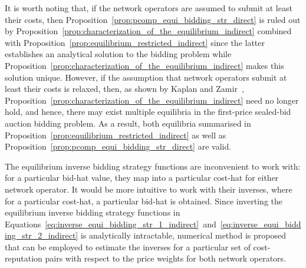 It is worth noting that, if the network operators are assumed to submit at least their costs, then Proposition~\ref{prop:pcomp_equi_bidding_str_direct} is ruled out by Proposition~\ref{prop:characterization_of_the_equilibrium_indirect} combined with Proposition~\ref{prop:equilibrium_restricted_indirect} since the latter establishes an analytical solution to the bidding problem while Proposition~\ref{prop:characterization_of_the_equilibrium_indirect} makes this solution unique. However, if the assumption that network operators submit at least their costs is relaxed, then, as shown by Kaplan and Zamir~\cite{KaplanZamir2011}, Proposition~\ref{prop:characterization_of_the_equilibrium_indirect} need no longer hold, and hence, there may exist multiple equilibria in the first-price sealed-bid auction bidding problem. As a result, both equilibria summarised in Proposition~\ref{prop:equilibrium_restricted_indirect} as well as Proposition~\ref{prop:pcomp_equi_bidding_str_direct} are valid. 

The equilibrium inverse bidding strategy functions are inconvenient to work with: for a particular bid-hat value, they map into a particular cost-hat for either network operator. It would be more intuitive to work with their inverses, where for a particular cost-hat, a particular bid-hat is obtained. Since inverting the equilibrium inverse bidding strategy functions in Equations~\eqref{eq:inverse_equi_bidding_str_1_indirect}~and~\eqref{eq:inverse_equi_bidding_str_2_indirect} is analytically intractable, numerical method is proposed that can be employed to estimate the inverses for a particular set of cost-reputation pairs with respect to the price weights for both network operators.


